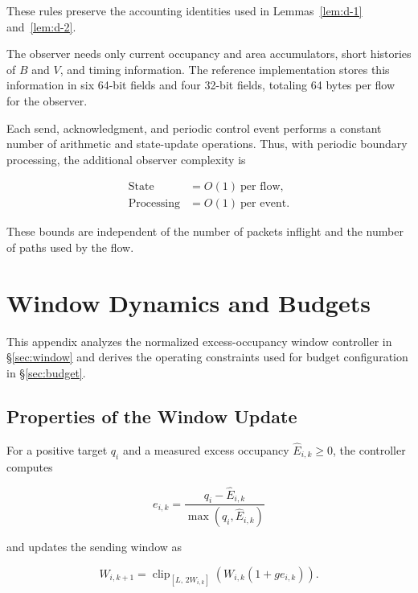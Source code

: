 These rules preserve the accounting identities used in Lemmas~\ref{lem:d-1} and~\ref{lem:d-2}.

The observer needs only current occupancy and area accumulators, short histories of \(B\) and \(V\), and timing information. The reference implementation stores this information in six 64-bit fields and four 32-bit fields, totaling 64 bytes per flow for the observer.

Each send, acknowledgment, and periodic control event performs a constant number of arithmetic and state-update operations. Thus, with periodic boundary processing, the additional observer complexity is

\begin{equation}
\label{eq:app-d-20}
\boxed{\begin{aligned}
\text{State}&=O(1)\ \text{per flow},\\
\text{Processing}&=O(1)\ \text{per event}.
\end{aligned}}
\end{equation}

These bounds are independent of the number of packets inflight and the number of paths used by the flow.


\section{Window Dynamics and Budgets}
\label{app:e}

This appendix analyzes the normalized excess-occupancy window controller in \S\ref{sec:window} and derives the operating constraints used for budget configuration in \S\ref{sec:budget}.

\subsection{Properties of the Window Update}
\label{app:e-1}

For a positive target \(q_i\) and a measured excess occupancy \(\widehat E_{i,k}\ge0\), the controller computes

\begin{equation}
\label{eq:app-e-1}
e_{i,k}
=
\frac{q_i-\widehat E_{i,k}}
{\max(q_i,\widehat E_{i,k})}
\end{equation}

and updates the sending window as

\begin{equation}
\label{eq:app-e-2}
W_{i,k+1}
=
\operatorname{clip}_{[L,\,2W_{i,k}]}
\left(W_{i,k}(1+ge_{i,k})\right).
\end{equation}


